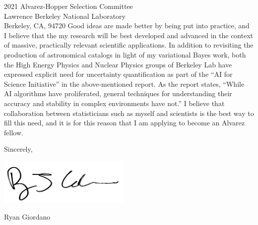 \documentclass{letter}
\begin{document}
\begin{letter}{2021 Alvarez-Hopper Selection Committee\\
Lawrence Berkeley National Laboratory\\
Berkeley, CA, 94720}
Good ideas are made better by being put into practice, and I believe that the my
research will be best developed and advanced in the context of massive,
practically relevant scientific applications.  In addition to revisiting the
production of astronomical catalogs in light of my variational Bayes work, both
the High Energy Physics and Nuclear Physics groups of Berkeley Lab have
expressed explicit need for uncertainty quantification as part of the ``AI for
Science Initiative'' in the above-mentioned report.  As the report states,
``While  AI algorithms have proliferated,  general  techniques  for
understanding  their accuracy  and stability in complex environments have not.''
I believe that collaboration between statisticians such as myself and scientists
is the best way to fill this need, and it is for this reason that I am applying
to become an Alvarez fellow.


\closing{Sincerely,}

\vspace{-5em}
\includegraphics[width=2.5in]{sig.png}

Ryan Giordano
\end{letter}

% 
% 
\end{document}
